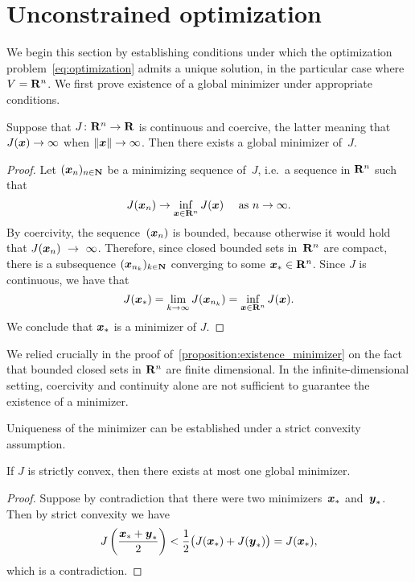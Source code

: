 \section{Unconstrained optimization}
We begin this section by establishing conditions under which the optimization problem~\eqref{eq:optimization} admits a unique solution,
in the particular case where $V = \mathbf R^n$.
We first prove existence of a global minimizer under appropriate conditions.
\begin{proposition}
    \label{proposition:existence_minimizer}
    Suppose that $J \colon \mathbf R^n \to \mathbf R$ is continuous and coercive,
    the latter meaning that $J(\mathbf{\boldsymbol{x}}) \to \infty$ when $\lVert\mathbf{\boldsymbol{x}}\rVert \to \infty$.
    Then there exists a global minimizer of~$J$.
\end{proposition}
\begin{proof}
    Let $(\mathbf{\boldsymbol{x}}_n)_{n \in \mathbf N}$ be a minimizing sequence of~$J$,
    i.e.\ a sequence in $\mathbf R^n$ such that
    \[
        J(\mathbf{\boldsymbol{x}}_n) \to \inf_{\mathbf{\boldsymbol{x}} \in \mathbf R^n} J(\mathbf{\boldsymbol{x}}) \quad \text{ as $n \to \infty$}.
    \]
    By coercivity, the sequence~$(\mathbf{\boldsymbol{x}}_n)$ is bounded,
    because otherwise it would hold that $J(\mathbf{\boldsymbol{x}}_n)~\to~\infty$.
    Therefore, since closed bounded sets in~$\mathbf R^n$ are compact,
    there is a subsequence $(\mathbf{\boldsymbol{x}}_{n_k})_{k \in \mathbf N}$ converging to some $\mathbf{\boldsymbol{x}}_* \in \mathbf R^n$.
    Since $J$ is continuous, we have that
    \[
        J(\mathbf{\boldsymbol{x}}_*) = \lim_{k \to \infty} J(\mathbf{\boldsymbol{x}}_{n_k}) = \inf_{\mathbf{\boldsymbol{x}} \in \mathbf R^n} J(\mathbf{\boldsymbol{x}}).
    \]
    We conclude that $\mathbf{\boldsymbol{x}}_*$ is a minimizer of $J$.
\end{proof}
\begin{remark}
    We relied crucially in the proof of~\cref{proposition:existence_minimizer} on the fact that bounded closed sets in $\mathbf R^n$ are finite dimensional.
    In the infinite-dimensional setting,
    coercivity and continuity alone are not sufficient to guarantee the existence of a minimizer.
\end{remark}
Uniqueness of the minimizer can be established under a strict convexity assumption.

\begin{proposition}
    If $J$ is strictly convex,
    then there exists at most one global minimizer.
\end{proposition}
\begin{proof}
    Suppose by contradiction that there were two minimizers~$\mathbf{\boldsymbol{x}}_*$ and~$\mathbf{\boldsymbol{y}}_*$.
    Then by strict convexity we have
    \[
        J \left( \frac{\mathbf{\boldsymbol{x}}_* + \mathbf{\boldsymbol{y}}_*}{2} \right)
        < \frac{1}{2} \bigl( J(\mathbf{\boldsymbol{x}}_*) + J(\mathbf{\boldsymbol{y}}_*) \bigr) = J(\mathbf{\boldsymbol{x}}_*),
    \]
    which is a contradiction.
\end{proof}

